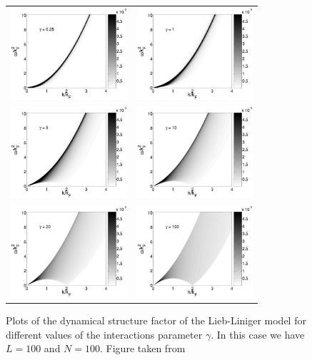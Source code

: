 \documentclass[11pt, a4paper]{report} %
\begin{document}
\begin{figure}[tb!]
  \centering
  \begin{tabular}{cc}
    \includegraphics[width=4.3cm]{c_0p25_L_100_N_100.eps}
    &
      \includegraphics[width=4.3cm]{c_1_L_100_N_100.eps} \\
    \includegraphics[width=4.3cm]{c_5_L_100_N_100.eps}
    &
      \includegraphics[width=4.3cm]{c_10_L_100_N_100.eps} \\
    \includegraphics[width=4.3cm]{c_20_L_100_N_100.eps}
    &
      \includegraphics[width=4.3cm]{c_100_L_100_N_100.eps}
  \end{tabular}
  \caption{Plots of the dynamical structure factor of the Lieb-Liniger model for different values of the interactions parameter \(\gamma\).
    In this case we have $L = 100$ and $N = 100$.
    Figure taken from~\cite{Caux2007a}}\label{fig:lieb_density_dsf}
\end{figure}
\end{document}
